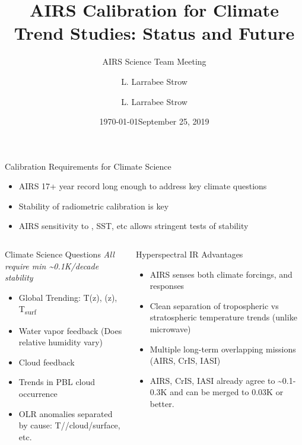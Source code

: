 \documentclass[10pt,t]{beamer}
\author{L. Larrabee Strow}
\date{\today}
\title{\large AIRS Calibration for Climate Trend Studies: Status and Future}
\subtitle{\footnotesize{AIRS Science Team Meeting}}
\date{\vspace{0.1in}\footnotesize{September 25, 2019\vfill}}
\author{L. Larrabee Strow\inst{1,2}}
\institute[UMBC]{\inst{1} UMBC Physics Dept. \and \inst{2}UMBC JCET}
\begin{document}
\maketitle
{}


\begin{frame}[label={sec:orge26c686},shrink=30]{Calibration Requirements for Climate Science}
\vspace{-0.1in}
\begin{large}
\begin{itemize}
\item AIRS 17+ year record long enough to address key climate questions
\item Stability of radiometric calibration is key
\item AIRS sensitivity to \cd, SST, etc allows stringent tests of stability
\end{itemize}
\end{large}
\vspace{-0.2in}
\begin{columns}
\begin{column}{0.55\columnwidth}
\begin{block}{Climate Science Questions}
\vspace{0.05in}
\emph{All require min \textasciitilde{}0.1K/decade stability}
\vspace{-0.05in}
\begin{itemize}
\item Global Trending: T(z), \water(z), T\textsubscript{surf}
\item Water vapor feedback (Does relative humidity vary)
\item Cloud feedback
\item Trends in PBL cloud occurrence
\item OLR anomalies separated by cause: T/\water/cloud/surface, etc.
\end{itemize}
\end{block}
\end{column}

\begin{column}{0.55\columnwidth}
\begin{block}{Hyperspectral IR Advantages}
\begin{itemize}
\item AIRS senses both climate forcings, and responses
\item Clean separation of tropospheric vs stratospheric temperature trends (unlike microwave)
\item Multiple long-term overlapping missions (AIRS, CrIS, IASI)
\item AIRS, CrIS, IASI already agree to \textasciitilde{}0.1-0.3K and can be merged to 0.03K or better.
\end{itemize}
\end{block}
\end{column}
\end{columns}




\end{frame}
\end{document}
